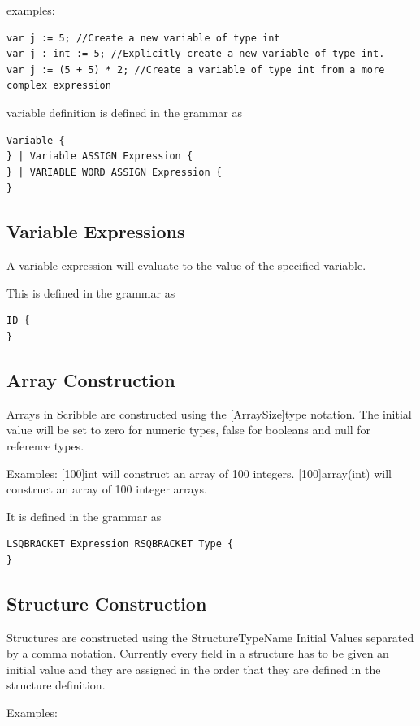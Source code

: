 \documentclass[]{final_report}
\begin{document}
examples:
\begin{verbatim}
var j := 5; //Create a new variable of type int
var j : int := 5; //Explicitly create a new variable of type int.
var j := (5 + 5) * 2; //Create a variable of type int from a more complex expression
\end{verbatim}

variable definition is defined in the grammar as
\begin{verbatim}
Variable {
} | Variable ASSIGN Expression {
} | VARIABLE WORD ASSIGN Expression {
}
\end{verbatim}

\subsection{Variable Expressions}

A variable expression will evaluate to the value of the specified variable.

This is defined in the grammar as \begin{verbatim}
ID {
}
\end{verbatim}

\subsection{Array Construction}

Arrays in Scribble are constructed using the [ArraySize]type notation. The initial value will be set to zero for numeric types, false for booleans and null for reference types.

Examples:
[100]int will construct an array of 100 integers.
[100]array(int) will construct an array of 100 integer arrays.

It is defined in the grammar as
\begin{verbatim}
LSQBRACKET Expression RSQBRACKET Type {
}
\end{verbatim}

\subsection{Structure Construction}

Structures are constructed using the StructureTypeName { Initial Values separated by a comma } notation. Currently every field in a structure has to be given an initial value and they are assigned in the order that they are defined in the structure definition.

Examples:
\end{document}
